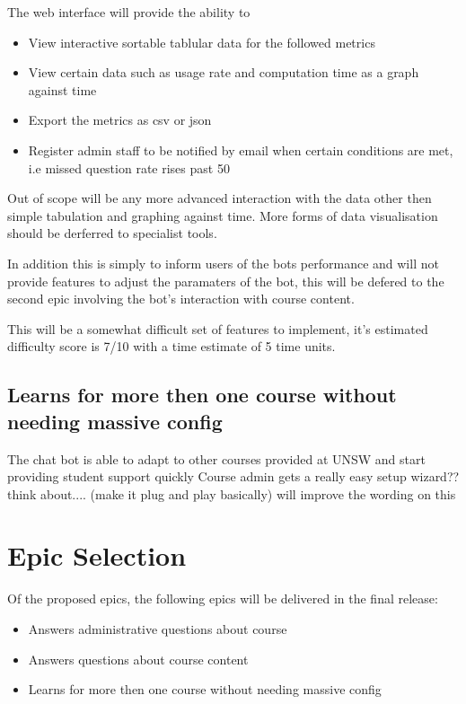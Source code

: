 \documentclass{article}
\begin{document}
The web interface will provide the ability to 
\begin{itemize}
  \item View interactive sortable tablular data for the followed metrics
  \item View certain data such as usage rate and computation time as a graph against time
  \item Export the metrics as csv or json
  \item Register admin staff to be notified by email when certain conditions are met, i.e missed question rate rises past 50%
\end{itemize}

Out of scope will be any more advanced interaction with the data other then simple tabulation and graphing against time. More forms of data visualisation should be derferred to specialist tools. 

In addition this is simply to inform users of the bots performance and will not provide features to adjust the paramaters of the bot, this will be defered to the second epic involving the bot's interaction with course content. 

This will be a somewhat difficult set of features to implement, it's estimated difficulty score is 7/10 with a time estimate of 5 time units.


\subsection{Learns for more then one course without needing massive config} %

The chat bot is able to adapt to other courses provided at UNSW and start providing student support quickly 
Course admin gets a really easy setup wizard?? think about.... 
(make it plug and play basically)   will improve the wording on this


\section{Epic Selection}

Of the proposed epics, the following epics will be delivered in the final release:
\begin{itemize}
  \item Answers administrative questions about course
  \item Answers questions about course content
  \item Learns for more then one course without needing massive config
\end{itemize}
\end{document}
